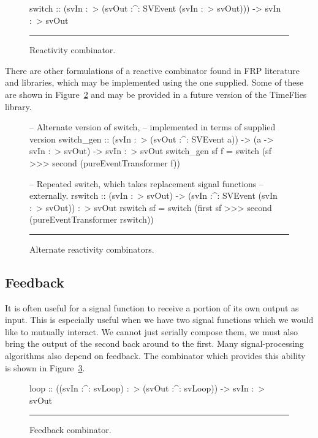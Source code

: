 \begin{figure}
\begin{code}
switch ::    (svIn :~> (svOut :^: SVEvent (svIn :~> svOut)))
          -> svIn :~> svOut
\end{code}
\hrule
\caption{Reactivity combinator.}
\label{figure:switch_combinator}
\end{figure}

There are other formulations of a reactive combinator found in FRP literature
and libraries, which may be implemented using the one supplied. Some of these
are shown in Figure~\ref{figure:alternate_switching_combinators} and may be
provided in a future version of the TimeFlies library.

\begin{figure}
\begin{code}
-- Alternate version of switch,
-- implemented in terms of supplied version
switch_gen ::    (svIn :~> (svOut :^: SVEvent a))
              -> (a -> svIn :~> svOut)
              -> svIn :~> svOut
switch_gen sf f =
  switch (sf >>> second (pureEventTransformer f))

-- Repeated switch, which takes replacement signal functions
-- externally.
rswitch ::    (svIn :~> svOut)
           -> (svIn :^: SVEvent (svIn :~> svOut)) :~> svOut
rswitch sf =
  switch (first sf >>> second (pureEventTransformer rswitch))
\end{code}
\hrule
\caption{Alternate reactivity combinators.}
\label{figure:alternate_switching_combinators}
\end{figure}

\subsection{Feedback}
\label{subsection:System_Design_and_Interface-Combinators-Feedback}

It is often useful for a signal function to receive a portion of its
own output as input. This is especially useful when we have two
signal functions which we would like to mutually interact. We cannot
just serially compose them, we must also bring the output of the second
back around to the first. Many signal-processing algorithms also depend
on feedback. The combinator which provides this ability is shown
in Figure~\ref{figure:feedback_combinator}. 

\begin{figure}
\begin{code}
loop ::    ((svIn :^: svLoop) :~> (svOut :^: svLoop))
        -> svIn :~> svOut
\end{code}
\hrule
\caption{Feedback combinator.}
\label{figure:feedback_combinator}
\end{figure}

